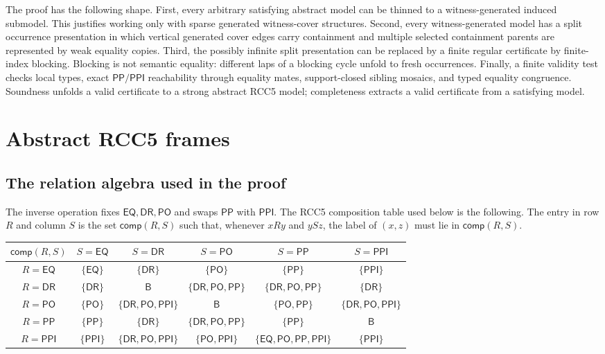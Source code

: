 \documentclass[11pt]{article}
\newcommand{\Base}{\mathsf{B}}
\newcommand{\EQ}{\mathsf{EQ}}
\newcommand{\DR}{\mathsf{DR}}
\newcommand{\PO}{\mathsf{PO}}
\newcommand{\PP}{\mathsf{PP}}
\newcommand{\PPI}{\mathsf{PPI}}
\newcommand{\comp}{\mathsf{comp}}
\begin{document}
The proof has the following shape.  First, every arbitrary satisfying abstract model can be thinned to a witness-generated induced submodel.  This justifies working only with sparse generated witness-cover structures.  Second, every witness-generated model has a split occurrence presentation in which vertical generated cover edges carry containment and multiple selected containment parents are represented by weak equality copies.  Third, the possibly infinite split presentation can be replaced by a finite regular certificate by finite-index blocking.  Blocking is not semantic equality: different laps of a blocking cycle unfold to fresh occurrences.  Finally, a finite validity test checks local types, exact $\PP/\PPI$ reachability through equality mates, support-closed sibling mosaics, and typed equality congruence.  Soundness unfolds a valid certificate to a strong abstract RCC5 model; completeness extracts a valid certificate from a satisfying model.

\section{Abstract RCC5 frames}

\subsection{The relation algebra used in the proof}

The inverse operation fixes $\EQ,\DR,\PO$ and swaps $\PP$ with $\PPI$.  The RCC5 composition table used below is the following.  The entry in row $R$ and column $S$ is the set $\comp(R,S)$ such that, whenever $xRy$ and $ySz$, the label of $(x,z)$ must lie in $\comp(R,S)$.

\begin{center}
\renewcommand{\arraystretch}{1.18}
\begin{tabular}{c|ccccc}
\toprule
$\comp(R,S)$ & $S=\EQ$ & $S=\DR$ & $S=\PO$ & $S=\PP$ & $S=\PPI$ \\
\midrule
$R=\EQ$  & $\{\EQ\}$ & $\{\DR\}$ & $\{\PO\}$ & $\{\PP\}$ & $\{\PPI\}$ \\
$R=\DR$  & $\{\DR\}$ & $\Base$ & $\{\DR,\PO,\PP\}$ & $\{\DR,\PO,\PP\}$ & $\{\DR\}$ \\
$R=\PO$  & $\{\PO\}$ & $\{\DR,\PO,\PPI\}$ & $\Base$ & $\{\PO,\PP\}$ & $\{\DR,\PO,\PPI\}$ \\
$R=\PP$  & $\{\PP\}$ & $\{\DR\}$ & $\{\DR,\PO,\PP\}$ & $\{\PP\}$ & $\Base$ \\
$R=\PPI$ & $\{\PPI\}$ & $\{\DR,\PO,\PPI\}$ & $\{\PO,\PPI\}$ & $\{\EQ,\PO,\PP,\PPI\}$ & $\{\PPI\}$ \\
\bottomrule
\end{tabular}
\end{center}
\end{document}
